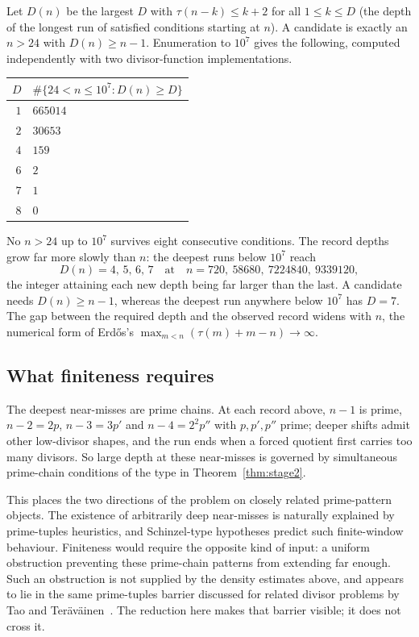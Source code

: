\documentclass[11pt]{article}
\theoremstyle{remark}
\newcommand{\tu}{\tau}
\begin{document}
Let $D(n)$ be the largest $D$ with $\tu(n-k)\le k+2$ for all $1\le k\le D$ (the depth
of the longest run of satisfied conditions starting at $n$). A candidate is exactly
an $n>24$ with $D(n)\ge n-1$. Enumeration to $10^7$ gives the following, computed
independently with two divisor-function implementations.

\begin{center}
\begin{tabular}{rl}
\hline
$D$ & $\#\{24<n\le 10^7: D(n)\ge D\}$\\
\hline
$1$ & $665014$\\
$2$ & $30653$\\
$4$ & $159$\\
$6$ & $2$\\
$7$ & $1$\\
$8$ & $0$\\
\hline
\end{tabular}
\end{center}

No $n>24$ up to $10^7$ survives eight consecutive conditions. The record depths grow
far more slowly than $n$: the deepest runs below $10^7$ reach
\[
  D(n)=4,\,5,\,6,\,7\quad\text{at}\quad n=720,\ 58680,\ 7224840,\ 9339120,
\]
the integer attaining each new depth being far larger than the last. A candidate
needs $D(n)\ge n-1$, whereas the deepest run anywhere below $10^7$ has $D=7$. The gap
between the required depth and the observed record widens with $n$, the numerical
form of Erd\H{o}s's $\max_{m<n}(\tu(m)+m-n)\to\infty$.

\subsection*{What finiteness requires}

The deepest near-misses are prime chains. At each record above, $n-1$ is prime,
$n-2=2p$, $n-3=3p'$ and $n-4=2^2p''$ with $p,p',p''$ prime; deeper shifts admit other
low-divisor shapes, and the run ends when a forced quotient first carries too many
divisors. So large depth at these near-misses is governed by simultaneous prime-chain
conditions of the type in Theorem~\ref{thm:stage2}.

This places the two directions of the problem on closely related prime-pattern
objects. The existence of arbitrarily deep near-misses is naturally explained by
prime-tuples heuristics, and Schinzel-type hypotheses predict such finite-window
behaviour. Finiteness would require the opposite kind of input: a uniform obstruction
preventing these prime-chain patterns from extending far enough. Such an obstruction
is not supplied by the density estimates above, and appears to lie in the same
prime-tuples barrier discussed for related divisor problems by Tao and
Ter\"av\"ainen~\cite{TaoTeravainen2025}. The reduction here makes that barrier
visible; it does not cross it.
\end{document}
